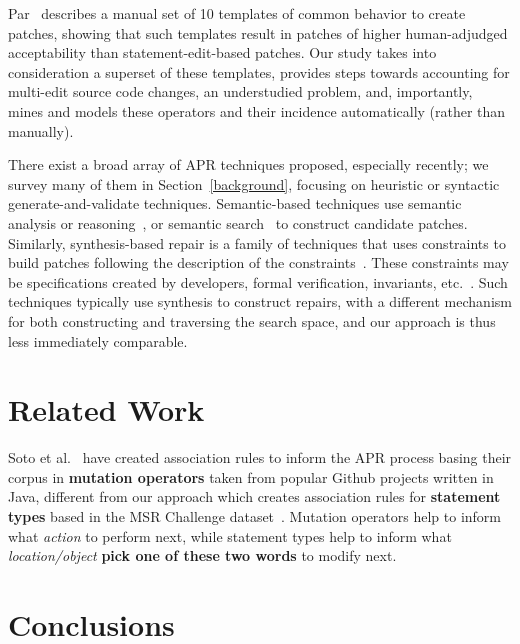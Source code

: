 \documentclass[sigconf]{acmart}
\newcommand{\todo}[1]
  {{\scriptsize \textbf{\color{red} {#1}}}}
\begin{document}
Par~\cite{kim2013} describes a manual set of 10 templates of common behavior to
create patches, showing that such templates result in patches of higher
human-adjudged acceptability than statement-edit-based patches.  Our study takes 
into consideration a superset
of these templates, provides steps towards
accounting for multi-edit source code changes, an understudied problem, and,
importantly, mines and models these operators and their incidence automatically
(rather than manually).

There exist a broad array of APR techniques proposed, especially recently; we
survey many of them in Section~\ref{background}, focusing on heuristic or
syntactic generate-and-validate techniques.  Semantic-based techniques use
semantic analysis or reasoning~\cite{nguyen13,mechtaev15,Mechtaev2016,Bach17S3}, or
semantic search~\cite{ke15} to construct candidate patches.  Similarly,
synthesis-based repair is a family of techniques that uses constraints to build
patches following the description of the constraints~\cite{jin11,wei10}. These constraints may be
specifications created by developers, formal verification, invariants,
etc.~\cite{jin11,wei10}.  Such techniques typically use synthesis to construct
repairs, with a different mechanism for both constructing and traversing the
search space, and our approach is thus less immediately comparable.


\section{Related Work}
Soto et al.~\cite{Soto18} have created association rules to inform the APR
process basing their corpus in \textbf{mutation operators} taken from popular Github projects
written in Java, 
different from our approach which creates association rules for \textbf{statement types} 
based in the MSR Challenge dataset~\cite{msr18challenge}. Mutation operators help to 
inform what \textit{action} to perform next, while statement types help to inform what
\textit{location/object}\todo{pick one of these two words} to modify next. 

\section{Conclusions}
\end{document}
